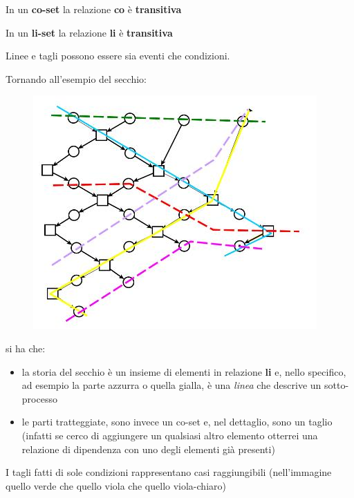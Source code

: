 \begin{nota}
In un \textbf{co-set} la relazione \textbf{co} è \textbf{transitiva}
\end{nota}

\begin{nota}
In un \textbf{li-set} la relazione \textbf{li} è \textbf{transitiva}
\end{nota}
\begin{nota}
Linee e tagli possono essere sia eventi che condizioni.
\end{nota}
\begin{esempio}
  Tornando all'esempio del secchio:
  \begin{figure}[H]
    \centering
    \includegraphics[scale = 0.5]{img/ta.jpg} 
  \end{figure}
  si ha che:
  \begin{itemize}
    \item la storia del secchio è un insieme di elementi in relazione
    \textbf{li} e, nello specifico, ad esempio la parte azzurra o quella gialla,
    è una \textit{linea} che descrive un sotto-processo
    \item le parti tratteggiate, sono invece
    un co-set e, nel dettaglio, sono un 
    taglio (infatti se cerco di aggiungere un qualsiasi altro elemento otterrei
    una relazione di dipendenza con uno degli elementi già presenti)
  \end{itemize}
\end{esempio}
\begin{nota}
I tagli fatti di sole condizioni rappresentano casi raggiungibili
  (nell'immagine quello verde che quello viola che quello viola-chiaro)
\end{nota}
